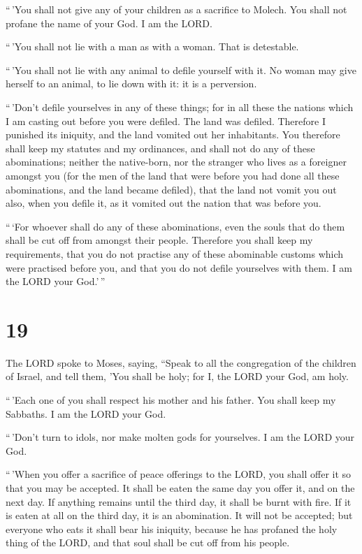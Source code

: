  ``\,'You shall not give any of your children as a
sacrifice to Molech. You shall not profane the name of your God. I am
the LORD.

 ``\,'You shall not lie with a man as with a woman. That
is detestable.

 ``\,'You shall not lie with any animal to defile
yourself with it. No woman may give herself to an animal, to lie down
with it: it is a perversion.

 ``\,'Don't defile yourselves in any of these things; for
in all these the nations which I am casting out before you were defiled.
 The land was defiled. Therefore I punished its iniquity,
and the land vomited out her inhabitants.  You therefore
shall keep my statutes and my ordinances, and shall not do any of these
abominations; neither the native-born, nor the stranger who lives as a
foreigner amongst you  (for the men of the land that were
before you had done all these abominations, and the land became
defiled),  that the land not vomit you out also, when you
defile it, as it vomited out the nation that was before you.

 ``\,`For whoever shall do any of these abominations,
even the souls that do them shall be cut off from amongst their people.
 Therefore you shall keep my requirements, that you do
not practise any of these abominable customs which were practised before
you, and that you do not defile yourselves with them. I am the LORD your
God.'\,''

\hypertarget{section-18}{%
\section{19}\label{section-18}}

 The LORD spoke to Moses, saying,  ``Speak
to all the congregation of the children of Israel, and tell them, 'You
shall be holy; for I, the LORD your God, am holy.

 ``\,'Each one of you shall respect his mother and his
father. You shall keep my Sabbaths. I am the LORD your God.

 ``\,'Don't turn to idols, nor make molten gods for
yourselves. I am the LORD your God.

 ``\,'When you offer a sacrifice of peace offerings to the
LORD, you shall offer it so that you may be accepted.  It
shall be eaten the same day you offer it, and on the next day. If
anything remains until the third day, it shall be burnt with fire.
 If it is eaten at all on the third day, it is an
abomination. It will not be accepted;  but everyone who
eats it shall bear his iniquity, because he has profaned the holy thing
of the LORD, and that soul shall be cut off from his people.

